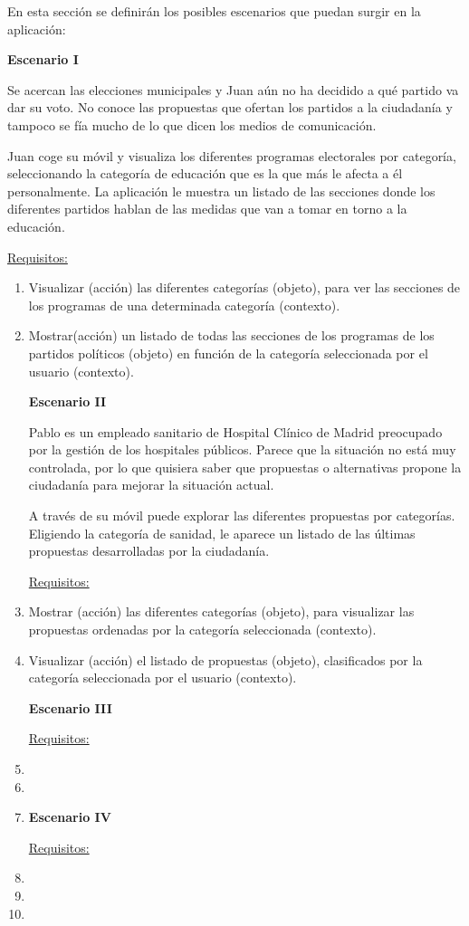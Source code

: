 En esta sección se definirán los posibles escenarios que puedan surgir en la aplicación:

\textbf{Escenario I}

Se acercan las elecciones municipales y Juan aún no ha decidido a qué partido va dar su voto. No conoce las propuestas que ofertan los partidos a la ciudadanía y tampoco se fía mucho de lo que dicen los medios de comunicación.

Juan coge su móvil y visualiza los diferentes programas electorales por categoría, seleccionando la categoría de educación que es la que más le afecta a él personalmente. La aplicación le muestra un listado de las secciones donde los diferentes partidos hablan de las medidas que van a tomar en torno a la educación.

\underline{Requisitos:}

\begin{enumerate}
\item Visualizar (acción) las diferentes categorías (objeto), para ver las secciones de los programas de una determinada categoría (contexto).
\item Mostrar(acción) un listado de todas las secciones de los programas de los partidos  políticos (objeto) en función de la categoría seleccionada por el usuario (contexto).

\textbf{Escenario II}

Pablo es un empleado sanitario de Hospital Clínico de Madrid preocupado por la gestión de los hospitales públicos. Parece que la situación no está muy controlada, por lo que quisiera saber que propuestas o alternativas propone la ciudadanía para mejorar la situación actual.

A través de su móvil puede explorar las diferentes propuestas por categorías. Eligiendo la categoría de sanidad, le aparece un listado de las últimas propuestas desarrolladas por la ciudadanía.

\underline{Requisitos:}

\item Mostrar (acción) las diferentes categorías (objeto), para visualizar las propuestas ordenadas por la categoría seleccionada (contexto).
\item Visualizar (acción) el listado de propuestas (objeto), clasificados por la categoría seleccionada por el usuario (contexto).

\textbf{Escenario III}

\underline{Requisitos:}

\item
\item
\item

\textbf{Escenario IV}

\underline{Requisitos:}

\item
\item
\item
\end{enumerate}

